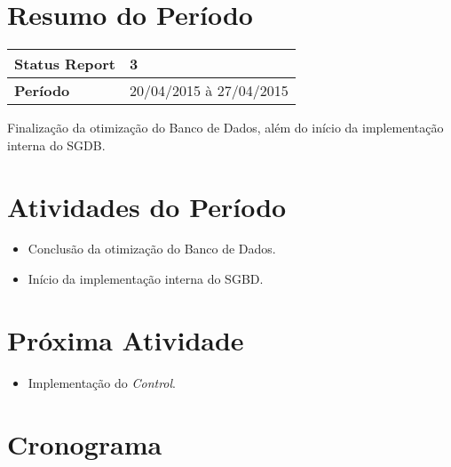 \documentclass[a4paper,12pt]{article}
\begin{document}

\newpage

\section{Resumo do Período}

\begin{longtable}{|l|l|}
\hline
\textbf{Status Report} & 3\\
\hline
\textbf{Período}	&	20/04/2015 à 27/04/2015 \\
\hline
\end{longtable}

Finalização da otimização do Banco de Dados, além do início da implementação interna do SGDB.

\section{Atividades do Período}

\begin{itemize}

\item{Conclusão da otimização do Banco de Dados.}
\item{Início da implementação interna do SGBD.}

\end{itemize}

\section{Próxima Atividade}



\begin{itemize}

\item{Implementação do \textit{Control}.}

\end{itemize}




\newpage
\section{Cronograma}
\end{document}
